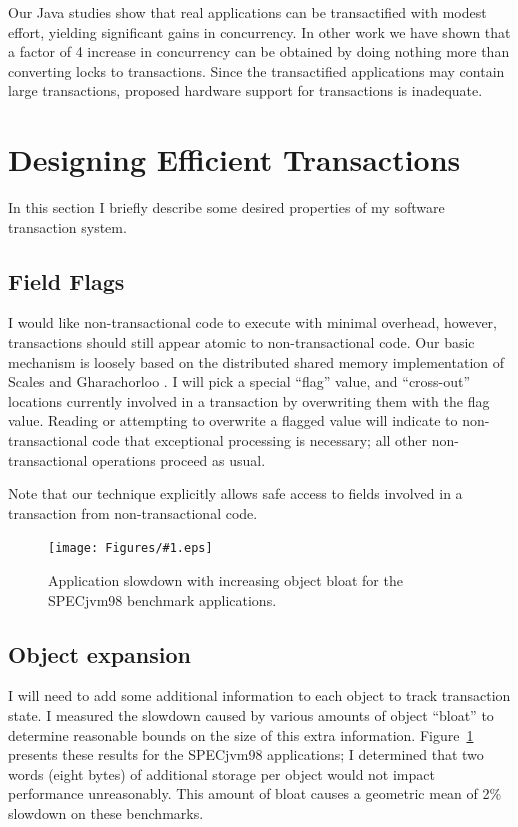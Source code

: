 \documentclass[12pt]{article}
\newcommand{\note}[1]{}%
\newcommand{\punt}[1]{}%
\newcommand{\sis}{\linespread{1.0}\setlength{\baselineskip}{0.8\baselineskip}}
\newcommand{\epsfigput}[2]{%
\begin{figure}[t]\sis%
\begin{center}%
\texttt{[image: Figures/\#1.eps]}%
\end{center}%
\caption{#2}%
\label{fig:#1}%
\end{figure}%
}
\newcommand{\secput}[2]{\section{#2}\label{sec:#1}}
\newcommand{\figref}[1]         {Figure~\ref{fig:#1}}
\begin{document}
\vspace*{5mm}

Our Java studies show that real applications can be
transactified with modest effort, yielding significant gains in
concurrency.  In other work \cite{AnanianAsKuLeLi04} we have shown
that a factor of 4 increase in concurrency can be obtained
by doing nothing more than converting locks to transactions.  Since
the transactified applications may contain large transactions,
proposed hardware support for transactions is inadequate.


\secput{efficient}{Designing Efficient Transactions}
In this section I briefly describe some desired properties of my
software transaction system.

\subsection{Field Flags}\label{sec:flagfield}
\note{Missing: performance numbers for adding check.  Use ``no trans''
version of transaction app and add check into the access functions.}
I would like non-transactional code to execute with minimal overhead,
however, transactions should still appear atomic to non-transactional
code.  Our basic mechanism is loosely based on the
distributed shared memory implementation of Scales and Gharachorloo
\cite{ScalesGh97}.  I will pick a special ``flag'' value, and
``cross-out'' locations currently involved in a transaction by
overwriting them with the flag value.  Reading or attempting to
overwrite a flagged value will indicate to non-transactional code
that exceptional processing is necessary; all other non-transactional
operations proceed as usual.

Note that our technique explicitly allows safe access to fields
involved in a transaction from non-transactional code.
\punt{
Ensuring that transactional updates remain atomic to non-transactional
code eases ``transactification'' and 
Key idea is to allow safe access by non-transactional code, so as to
allow transactification.
}

\epsfigput{bloat}{Application slowdown with increasing object bloat
for the SPECjvm98 benchmark applications.}
\subsection{Object expansion}
I will need to add some additional information to each object to
track transaction state.  I measured the slowdown caused by various
amounts of object ``bloat'' to determine reasonable bounds on the
size of this extra information.  \figref{bloat} presents these
results for the SPECjvm98 applications; I determined that two words
(eight bytes) of additional storage per object would not impact
performance unreasonably.  This amount of bloat causes a geometric
mean of 2\% slowdown on these benchmarks.
\end{document}
